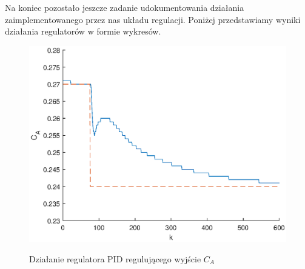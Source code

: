 Na koniec pozostało jeszcze zadanie udokumentowania działania zaimplementowanego przez nas układu regulacji. Poniżej przedstawiamy wyniki działania regulatorów w formie wykresów.

\begin{figure}[h!]
	\centering
	\includegraphics[width=.8\linewidth]{img/pid.eps}
	\label{ch2:pid}
	\caption{Działanie regulatora PID regulującego wyjście $C_A$}
\end{figure}
